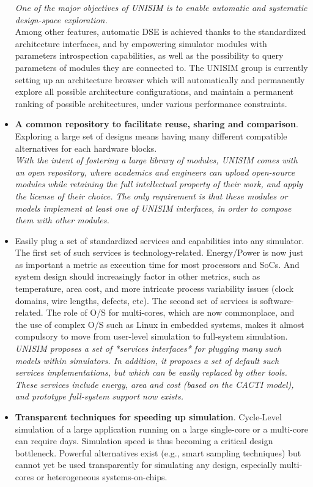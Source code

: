 \begin{itemize}
\emph{One of the major objectives of UNISIM is to enable automatic and systematic design-space exploration.}\\
Among other features, automatic DSE is achieved thanks to the standardized architecture interfaces, and by empowering simulator modules with parameters introspection capabilities, as well as the possibility to query parameters of modules they are connected to. The UNISIM group is currently setting up an architecture browser which will automatically and permanently explore all possible architecture configurations, and maintain a permanent ranking of possible architectures, under various performance constraints.
\item \textbf{A common repository to facilitate reuse, sharing and comparison}. Exploring a large set of designs means having many different compatible alternatives for each hardware blocks.\\
\emph{With the intent of fostering a large library of modules, UNISIM comes with an open repository, where academics and engineers can upload open-source modules while retaining the full intellectual property of their work, and apply the license of their choice. The only requirement is that these modules or models implement at least one of UNISIM interfaces, in order to compose them with other modules.}
\item Easily plug a set of standardized services and capabilities into any simulator. The first set of such services is technology-related. Energy/Power is now just as important a metric as execution time for most processors and SoCs. And system design should increasingly factor in other metrics, such as temperature, area cost, and more intricate process variability issues (clock domains, wire lengths, defects, etc). The second set of services is software-related. The role of O/S for multi-cores, which are now commonplace, and the use of complex O/S such as Linux in embedded systems, makes it almost compulsory to move from user-level simulation to full-system simulation.\\
\emph{UNISIM proposes a set of *services interfaces* for plugging many such models within simulators. In addition, it proposes a set of default such services implementations, but which can be easily replaced by other tools. These services include energy, area and cost (based on the CACTI model), and prototype full-system support now exists.}
\item \textbf{Transparent techniques for speeding up simulation}. Cycle-Level simulation of a large application running on a large single-core or a multi-core can require days. Simulation speed is thus becoming a critical design bottleneck. Powerful alternatives exist (e.g., smart sampling techniques) but cannot yet be used transparently for simulating any design, especially multi-cores or heterogeneous systems-on-chips.\\

\end{itemize}
